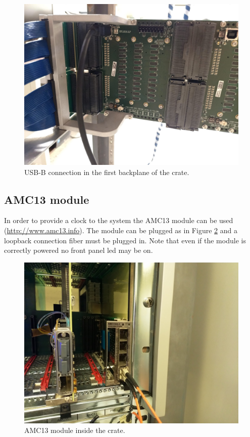 \documentclass[10pt,a4paper]{article}
\begin{document}
\begin{figure}[h!]
\centering
 \includegraphics[width=0.8\linewidth]{USBBCrate.jpeg} 
  \caption{USB-B connection in the first backplane of the crate.}
  \label{USBBCrate}
\end{figure}

\subsection{AMC13 module}
In order to provide a clock to the system the AMC13 module can be used (\url{http://www.amc13.info}). The module can be plugged as in Figure \ref{amc13} and a loopback connection fiber must be plugged in. Note that even if the module is correctly powered no front panel led may be on.
\begin{figure}[h!]
\centering
 \includegraphics[width=0.8\linewidth]{amc13.jpg} 
  \caption{AMC13 module inside the crate.}
  \label{amc13}
\end{figure}
\end{document}
